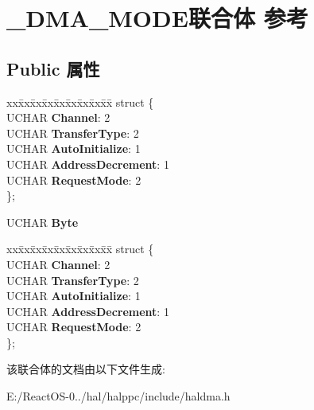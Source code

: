 \hypertarget{union___d_m_a___m_o_d_e}{}\section{\+\_\+\+D\+M\+A\+\_\+\+M\+O\+D\+E联合体 参考}
\label{union___d_m_a___m_o_d_e}
\subsection*{Public 属性}
\begin{DoxyCompactItemize}
\item 
\mbox{\label{union___d_m_a___m_o_d_e_ab3e5cadc69795661ad70e000b0faddd4}} 
\begin{tabbing}
xx\=xx\=xx\=xx\=xx\=xx\=xx\=xx\=xx\=\kill
struct \{\\
\>UCHAR {\bfseries Channel}: 2\\
\>UCHAR {\bfseries TransferType}: 2\\
\>UCHAR {\bfseries AutoInitialize}: 1\\
\>UCHAR {\bfseries AddressDecrement}: 1\\
\>UCHAR {\bfseries RequestMode}: 2\\
\}; \\

\end{tabbing}\item 
\mbox{\label{union___d_m_a___m_o_d_e_a808632f3332719014120228ef15e4ed8}} 
U\+C\+H\+AR {\bfseries Byte}
\item 
\mbox{\label{union___d_m_a___m_o_d_e_adcceed2db75ec442391aee9b41b3bff3}} 
\begin{tabbing}
xx\=xx\=xx\=xx\=xx\=xx\=xx\=xx\=xx\=\kill
struct \{\\
\>UCHAR {\bfseries Channel}: 2\\
\>UCHAR {\bfseries TransferType}: 2\\
\>UCHAR {\bfseries AutoInitialize}: 1\\
\>UCHAR {\bfseries AddressDecrement}: 1\\
\>UCHAR {\bfseries RequestMode}: 2\\
\}; \\

\end{tabbing}\end{DoxyCompactItemize}


该联合体的文档由以下文件生成\+:\begin{DoxyCompactItemize}
\item 
E\+:/\+React\+O\+S-\/0../hal/halppc/include/haldma.\+h\end{DoxyCompactItemize}
